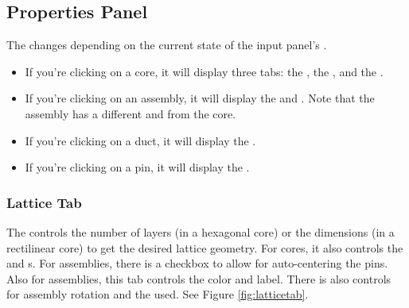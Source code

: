\subsection{Properties Panel}
The  changes depending on the current state of the input panel's .
\begin{itemize}
	\item{If you're clicking on a core, it will display three tabs: the , the , and the .}
	\item{If you're clicking on an assembly, it will display the  and .  Note that the assembly has a different  and  from the core.}
	\item{If you're clicking on a duct, it will display the .}
	\item{If you're clicking on a pin, it will display the .}
\end{itemize}

\subsubsection{Lattice Tab}
The  controls the number of layers (in a hexagonal core) or the dimensions (in a rectilinear core) to get the desired lattice geometry.  For cores, it also controls the  and s.  For assemblies, there is a checkbox to allow for auto-centering the pins.  Also for assemblies, this tab controls the  color and label.  There is also controls for assembly rotation and the  used.  See Figure \ref{fig:latticetab}.

